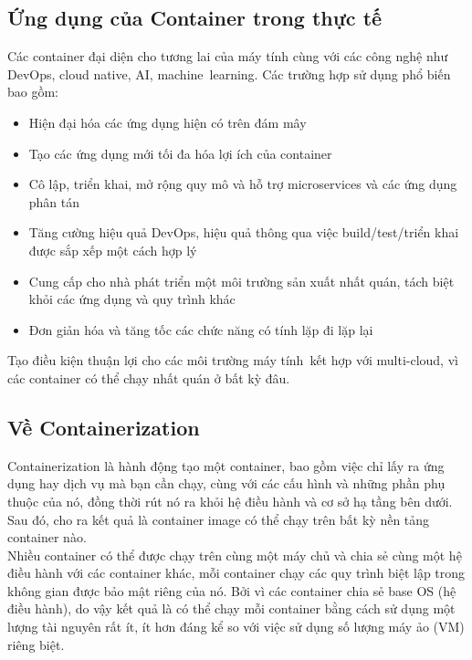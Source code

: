 \documentclass[14pt,a4paper]{report}
\begin{document}
	\subsection{Ứng dụng của Container trong thực tế}
	\hspace{1cm}Các container đại diện cho tương lai của máy tính cùng với các công nghệ như DevOps, cloud native, AI, machine learning. Các trường hợp sử dụng phổ biến bao gồm:
	\begin{itemize}
		\item Hiện đại hóa các ứng dụng hiện có trên đám mây
		\item Tạo các ứng dụng mới tối đa hóa lợi ích của container
		\item Cô lập, triển khai, mở rộng quy mô và hỗ trợ microservices và các ứng dụng phân tán
		\item Tăng cường hiệu quả DevOps, hiệu quả thông qua việc build/test/triển khai được sắp xếp một cách hợp lý
		\item Cung cấp cho nhà phát triển một môi trường sản xuất nhất quán, tách biệt khỏi các ứng dụng và quy trình khác
		\item Đơn giản hóa và tăng tốc các chức năng có tính lặp đi lặp lại\\
	\end{itemize}
	
	\hspace{0.3cm}Tạo điều kiện thuận lợi cho các môi trường máy tính kết hợp với multi-cloud, vì các container có thể chạy nhất quán ở bất kỳ đâu.
	\subsection{Về Containerization}
	\hspace{1cm}Containerization là hành động tạo một container, bao gồm việc chỉ lấy ra ứng dụng hay dịch vụ mà bạn cần chạy, cùng với các cấu hình và những phần phụ thuộc của nó, đồng thời rút nó ra khỏi hệ điều hành và cơ sở hạ tầng bên dưới. Sau đó, cho ra kết quả là container image có thể chạy trên bất kỳ nền tảng container nào.\\
	
	\hspace{0.3cm}Nhiều container có thể được chạy trên cùng một máy chủ và chia sẻ cùng một hệ điều hành với các container khác, mỗi container chạy các quy trình biệt lập trong không gian được bảo mật riêng của nó. Bởi vì các container chia sẻ base OS (hệ điều hành), do vậy kết quả là có thể chạy mỗi container bằng cách sử dụng một lượng tài nguyên rất ít, ít hơn đáng kể so với việc sử dụng số lượng máy ảo (VM) riêng biệt.
\end{document}
